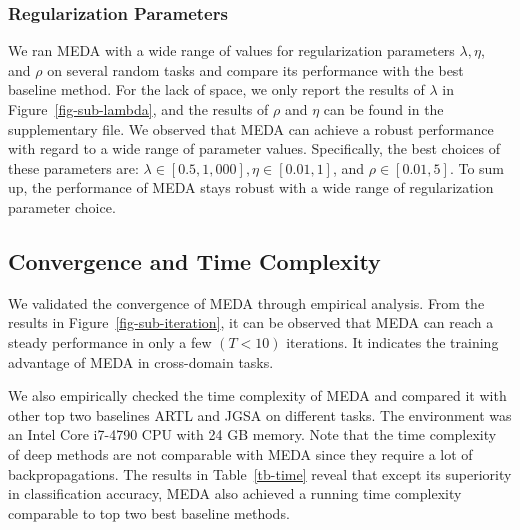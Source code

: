 \documentclass[sigconf]{acmart}
\begin{document}
\subsubsection{Regularization Parameters}

We ran MEDA with a wide range of values for regularization parameters $\lambda,\eta$, and $\rho$ on several random tasks and compare its performance with the best baseline method. For the lack of space, we only report the results of $\lambda$ in Figure~\ref{fig-sub-lambda}, and the results of $\rho$ and $\eta$ can be found in the supplementary file. We observed that MEDA can achieve a robust performance with regard to a wide range of parameter values. Specifically, the best choices of these parameters are: $\lambda \in [0.5, 1,000], \eta \in [0.01,1]$, and $\rho \in [0.01,5]$. To sum up, the performance of MEDA stays robust with a wide range of regularization parameter choice. 

\subsection{Convergence and Time Complexity}
\label{sec-conver}

We validated the convergence of MEDA through empirical analysis. From the results in Figure~\ref{fig-sub-iteration}, it can be observed that MEDA can reach a steady performance in only a few $(T < 10)$ iterations. It indicates the training advantage of MEDA in cross-domain tasks.

We also empirically checked the time complexity of MEDA and compared it with other top two baselines ARTL and JGSA on different tasks. The environment was an Intel Core i7-4790 CPU with 24 GB memory. Note that the time complexity of deep methods are not comparable with MEDA since they require a lot of backpropagations. The results in Table~\ref{tb-time} reveal that except its superiority in classification accuracy, MEDA also achieved a running time complexity comparable to top two best baseline methods.

\begin{table}[]
	\centering
\caption{Running time~(s) of ARTL, JGSA, and MEDA.}
	\label{tb-time}
	\vspace{-.15in}
\vspace{-.2in}
\end{table}
\end{document}
